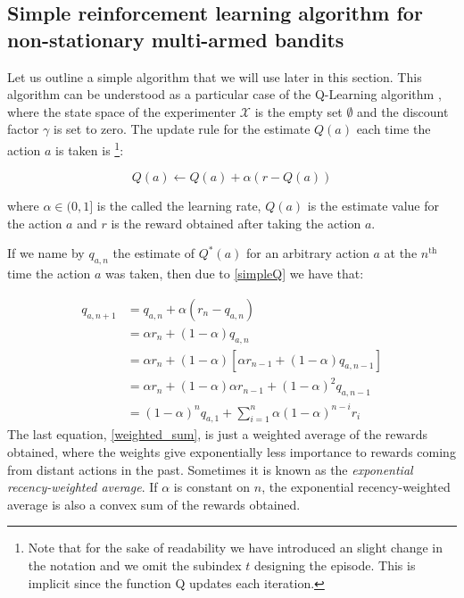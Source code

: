 \documentclass[11pt,a4paper,twoside]{report}
\newcommand{\+}{\textnormal{+} }
\theoremstyle{definition}
\numberwithin{equation}{chapter}
\begin{document}
\subsection{Simple reinforcement learning algorithm for non-stationary
multi-armed bandits} \label{SimpleRL}

Let us outline a simple algorithm that we will use later in this section. This
algorithm can be understood as a particular case of the Q-Learning algorithm
\cite{sutton2018reinforcement}, where the state space of the experimenter
$\mathcal{X}$ is the empty set $\emptyset$ and the discount factor $\gamma$ is
set to zero. The update rule for the estimate $Q(a)$ each time the action $a$ is
taken is \footnote{Note that for the sake of readability we have introduced an
slight change in the notation and we omit the subindex $t$ designing the
episode. This is implicit since the function Q updates each iteration.}:

\begin{equation}
  Q(a) \leftarrow Q(a) + \alpha \left( r - Q(a) \right)
  \label{simpleQ}
\end{equation}

where $\alpha \in (0,1]$ is the called the learning rate, $Q(a)$ is the
estimate value for the action $a$ and $r$ is the reward obtained after taking
the action $a$.

If we name by $q_{a,n}$ the estimate of $Q^*(a)$ for an arbitrary action $a$ at the
 $n^\text{th}$ time the action $a$ was taken, then due to \eqref{simpleQ} we
 have that:

 \begin{align}
  q_{a,n+1} &=q_{a,n}+\alpha\left(r_{n}-q_{a,n}\right) \\
  &=\alpha r_{n}+(1-\alpha) q_{a,n} \\
  &=\alpha r_{n}+(1-\alpha)\left[\alpha r_{n-1}+(1-\alpha) q_{a,n-1}\right] \\
  &=\alpha r_{n}+(1-\alpha) \alpha r_{n-1}+(1-\alpha)^{2} q_{a,n-1} \\
  &=(1-\alpha)^{n} q_{a,1}+\sum_{i=1}^{n} \alpha(1-\alpha)^{n-i} r_{i}
  \label{weighted_sum}
  \end{align}
The last equation, \eqref{weighted_sum}, is just a weighted average of the
rewards obtained, where the weights give exponentially less importance to
rewards coming from distant actions in the past. Sometimes it is known as the
\textit{exponential recency-weighted average}. If $\alpha$ is constant on $n$,
the exponential recency-weighted average is also a convex sum of the rewards
obtained.
\end{document}
